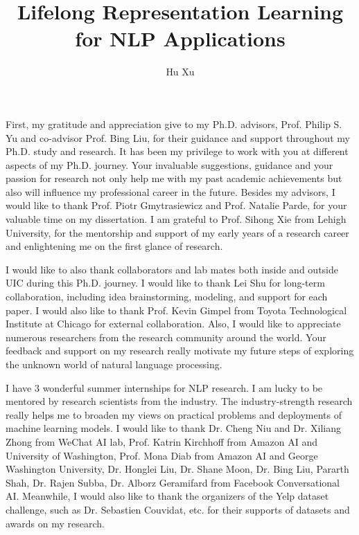 \documentclass{uicthesi}
\newcounter{problem}
\begin{document}
\title{Lifelong Representation Learning for NLP Applications}
\author{Hu Xu}
\maketitle


\acknowledgements
{First, my gratitude and appreciation give to my Ph.D. advisors, Prof. Philip
S. Yu and co-advisor Prof. Bing Liu, for their guidance and support throughout my Ph.D. study and research. 
It has been my privilege to work with you at different aspects of my Ph.D. journey. 
Your invaluable suggestions, guidance and your passion for research not only help me with my past academic achievements but also will influence
my professional career in the future.
Besides my advisors, I would like to thank Prof. Piotr Gmytrasiewicz and Prof. Natalie Parde, for your valuable time on my dissertation.
I am grateful to Prof. Sihong Xie from Lehigh University, for the mentorship and support of my early years of a research career and enlightening me on the first glance of research. 

I would like to also thank collaborators and lab mates both inside and outside UIC during this Ph.D. journey.
I would like to thank Lei Shu for long-term collaboration, including idea brainstorming, modeling, and support for each paper.
I would also like to thank Prof. Kevin Gimpel from Toyota Technological Institute at Chicago for external collaboration.
Also, I would like to appreciate numerous researchers from the research community around the world. 
Your feedback and support on my research really motivate my future steps of exploring the unknown world of natural language processing. 

I have 3 wonderful summer internships for NLP research. I am lucky to be mentored by research scientists from the industry. The industry-strength research really helps me to broaden my views on practical problems and deployments of machine learning models.
I would like to thank Dr. Cheng Niu and Dr. Xiliang Zhong from WeChat AI lab, Prof. Katrin Kirchhoff from Amazon AI and University of Washington, Prof. Mona Diab from Amazon AI and George Washington University, Dr. Honglei Liu, Dr. Shane Moon, Dr. Bing Liu, Pararth Shah, Dr. Rajen Subba, Dr. Alborz Geramifard from Facebook Conversational AI.
Meanwhile, I would also like to thank the organizers of the Yelp dataset challenge, such as Dr. Sebastien Couvidat, etc. for their supports of datasets and awards on my research.

}
\end{document}
